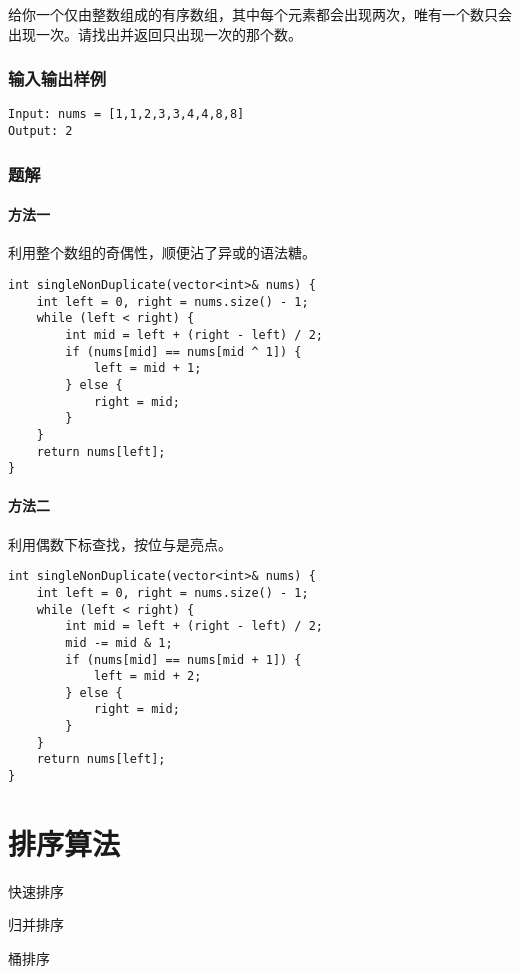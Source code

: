 \documentclass[lang=cn,10pt]{elegantbook}
\begin{document}
给你一个仅由整数组成的有序数组，其中每个元素都会出现两次，唯有一个数只会出现一次。请找出并返回只出现一次的那个数。

\subsection*{输入输出样例}

\begin{lstlisting}
Input: nums = [1,1,2,3,3,4,4,8,8]
Output: 2
\end{lstlisting}

\subsection*{题解}

\subsubsection*{方法一}

利用整个数组的奇偶性，顺便沾了异或的语法糖。

\begin{lstlisting}
int singleNonDuplicate(vector<int>& nums) {
	int left = 0, right = nums.size() - 1;
	while (left < right) {
		int mid = left + (right - left) / 2;
		if (nums[mid] == nums[mid ^ 1]) {
			left = mid + 1;
		} else {
			right = mid;
		}
	}
	return nums[left];
}
\end{lstlisting}

\subsubsection*{方法二}

利用偶数下标查找，按位与是亮点。

\begin{lstlisting}
int singleNonDuplicate(vector<int>& nums) {
	int left = 0, right = nums.size() - 1;
	while (left < right) {
		int mid = left + (right - left) / 2;
		mid -= mid & 1;
		if (nums[mid] == nums[mid + 1]) {
			left = mid + 2;
		} else {
			right = mid;
		}
	}
	return nums[left];
}
\end{lstlisting}

\chapter{排序算法}

\begin{introduction}[前情提要]
	\item 快速排序
	\item 归并排序
	\item 桶排序
\end{introduction}
\end{document}
